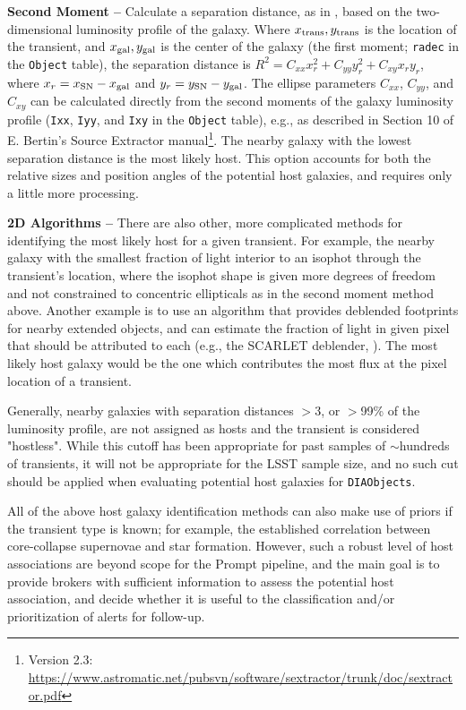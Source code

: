 \documentclass[DM,lsstdraft,authoryear,toc]{lsstdoc}
\begin{document}
{\bf Second Moment --} Calculate a separation distance, as in \citet{2006ApJ...648..868S}, based on the two-dimensional luminosity profile of the galaxy.
Where $x_{\rm trans},y_{\rm trans}$ is the location of the transient, and $x_{\rm gal},y_{\rm gal}$ is the center of the galaxy (the first moment; {\tt radec} in the {\tt Object} table), the separation distance is $R^2 = C_{xx} x_r^2 + C_{yy} y_r^2 + C_{xy} x_r y_r$, where $x_r = x_{\rm SN} - x_{\rm gal}$ and $y_r = y_{\rm SN} - y_{\rm gal}$.
The ellipse parameters $C_{xx}$, $C_{yy}$, and $C_{xy}$ can be calculated directly from the second moments of the galaxy luminosity profile ({\tt Ixx}, {\tt Iyy}, and {\tt Ixy} in the {\tt Object} table), e.g., as described in Section 10 of E. Bertin's Source Extractor manual\footnote{Version 2.3: \url{https://www.astromatic.net/pubsvn/software/sextractor/trunk/doc/sextractor.pdf}}.
The nearby galaxy with the lowest separation distance is the most likely host.
This option accounts for both the relative sizes and position angles of the potential host galaxies, and requires only a little more processing. 

{\bf 2D Algorithms --} There are also other, more complicated methods for identifying the most likely host for a given transient.
For example, the nearby galaxy with the smallest fraction of light interior to an isophot through the transient's location, where the isophot shape is given more degrees of freedom and not constrained to concentric ellipticals as in the second moment method above.
Another example is to use an algorithm that provides deblended footprints for nearby extended objects, and can estimate the fraction of light in given pixel that should be attributed to each (e.g., the SCARLET deblender, \cite{2018A&C....24..129M}).
The most likely host galaxy would be the one which contributes the most flux at the pixel location of a transient.

Generally, nearby galaxies with separation distances $>$3, or $>$99\% of the luminosity profile, are not assigned as hosts and the transient is considered "hostless".
While this cutoff has been appropriate for past samples of $\sim$hundreds of transients, it will not be appropriate for the LSST sample size, and no such cut should be applied when evaluating potential host galaxies for {\tt DIAObjects}. 

All of the above host galaxy identification methods can also make use of priors if the transient type is known; for example, the established correlation between core-collapse supernovae and star formation.
However, such a robust level of host associations are beyond scope for the Prompt pipeline, and the main goal is to provide brokers with sufficient information to assess the potential host association, and decide whether it is useful to the classification and/or prioritization of alerts for follow-up. 
\end{document}
